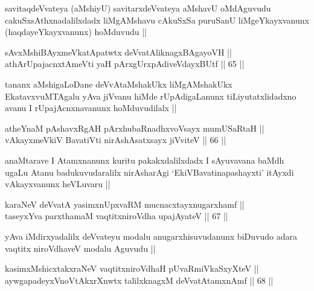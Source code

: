 \begin{artha}
savitaqdeVvateya (aMshiyU) savitarxdeVvateya aMshavU oMdAguvudu
cakuSxsAthxnadalilxdadx liMgAMshavu cAkuSxSa puruSanU liMgeYkayxvanunx
(haqdayeYkayxvanunx) hoMduvudu ||
\end{artha}


\begin{shl}
sAvxMshiBAyxmeVkatApatwtx deVvatAliknagxBAgayoVH || \\
athArUpajacnxtAmeVti yaH pArxgUrxpAdiveVdayxBUtf ||  65 ||  
\end{shl}

\begin{artha}
tananx aMshigaLoDane deVvAtaMshakUkx liMgAMshakUkx EkatavxvuMTAgalu
yAva jiVvanu hiMde rUpAdigaLanunx tiLiyutatxlidadxno avanu I
rUpajAcnxnavanunx hoMduvudilalx ||
\end{artha}


\begin{shl}
atheYnaM pAshavxRgAH pArxhubaRnadhxvoV\s sayx mumUSaRtaH || \\
vAkayxmeVkiV BavatiVti nirAshAsatxsayx jiVviteV ||  66 ||  
\end{shl}

\begin{artha}
anaMtarave I Atamxnanunx kuritu pakakxdalilxdadx I sAyuvavana
baMdh ugaLu Atanu badukuvudaralilx nirAsharAgi `EkiVBavatinapashayxti'
itAyxdi vAkayxvanunx heVLuvaru ||
\end{artha}


\begin{shl}
karaNeV deVvatA yasimxnUpxvaRM mucnacxtayxnugarxhamf || \\
taseyxYva parxthamaM vaqtitxniroVdha upajAyateV ||  67 ||  
\end{shl}

\begin{artha}
yAva iMdirxyadalilx deVvateyu modalu anugarxhisuvudanunx biDuvudo
adara vaqtitx niroVdhaveV modalu Aguvudu ||
\end{artha}


\begin{shl}
kasimxMshicxtakxraNeV vaqtitxniroVdhaH pUvaRmiVkaSxyXteV || \\
aywgapadeyxVnoVtAkxrXnwtx talilxknagxM deVvatAtamxnAmf ||  68 ||  
\end{shl}

